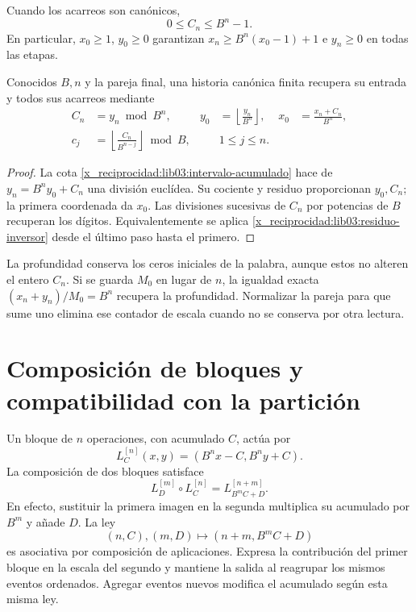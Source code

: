 Cuando los acarreos son canónicos,
\begin{equation}
 0\leq C_n\leq B^n-1.
 \label{x_reciprocidad:lib03:intervalo-acumulado}
\end{equation}
En particular, \(x_0\geq1\), \(y_0\geq0\) garantizan
\(x_n\geq B^n(x_0-1)+1\) e \(y_n\geq0\) en todas las etapas.

\begin{corollary}
\label{x_reciprocidad:lib03:cor-palabra}
Conocidos \(B,n\) y la pareja final, una historia canónica finita
recupera su entrada y todos sus acarreos mediante
\begin{align}
 C_n&=y_n\bmod B^n,&
 y_0&=\left\lfloor\frac{y_n}{B^n}\right\rfloor,&
 x_0&=\frac{x_n+C_n}{B^n},
 \label{x_reciprocidad:lib03:recuperacion-inicial}\\
 c_j&=\left\lfloor\frac{C_n}{B^{n-j}}\right\rfloor\bmod B,
 &&1\leq j\leq n.
 \label{x_reciprocidad:lib03:recuperacion-digitos}
\end{align}
\end{corollary}

\begin{proof}
La cota \eqref{x_reciprocidad:lib03:intervalo-acumulado} hace de
\(y_n=B^ny_0+C_n\) una división euclídea. Su cociente y residuo
proporcionan \(y_0,C_n\); la primera coordenada da \(x_0\).
Las divisiones sucesivas de \(C_n\) por potencias de \(B\) recuperan
los dígitos. Equivalentemente se aplica
\eqref{x_reciprocidad:lib03:residuo-inversor} desde el último paso hasta el primero.
\end{proof}

La profundidad conserva los ceros iniciales de la palabra, aunque estos
no alteren el entero \(C_n\). Si se guarda \(M_0\) en lugar de
\(n\), la igualdad exacta \((x_n+y_n)/M_0=B^n\) recupera la
profundidad. Normalizar la pareja para que sume uno elimina ese contador
de escala cuando no se conserva por otra lectura.

\section{Composición de bloques y compatibilidad con la partición}
\label{x_reciprocidad:lib03:composicion}

Un bloque de \(n\) operaciones, con acumulado \(C\), actúa por
\begin{equation}
 L_C^{[n]}(x,y)=(B^nx-C,B^ny+C).
 \label{x_reciprocidad:lib03:bloque}
\end{equation}
La composición de dos bloques satisface
\begin{equation}
 L_D^{[m]}\circ L_C^{[n]}=L_{B^mC+D}^{[n+m]}.
 \label{x_reciprocidad:lib03:ley-bloques}
\end{equation}
En efecto, sustituir la primera imagen en la segunda multiplica su
acumulado por \(B^m\) y añade \(D\). La ley
\[
 (n,C),(m,D)\longmapsto(n+m,B^mC+D)
\]
es asociativa por composición de aplicaciones. Expresa la contribución
del primer bloque en la escala del segundo y mantiene la salida al
reagrupar los mismos eventos ordenados. Agregar eventos nuevos modifica
el acumulado según esta misma ley.

